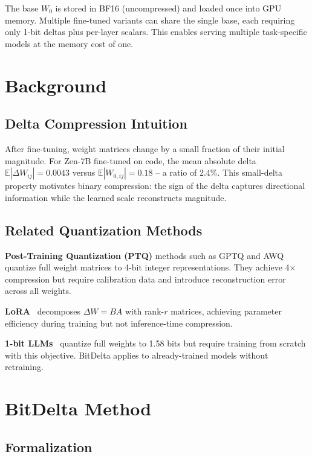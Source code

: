 \documentclass[11pt,a4paper]{article}
\begin{document}
The base $W_0$ is stored in BF16 (uncompressed) and loaded once into GPU memory.
Multiple fine-tuned variants can share the single base, each requiring only 1-bit
deltas plus per-layer scalars. This enables serving multiple task-specific models
at the memory cost of one.

\section{Background}

\subsection{Delta Compression Intuition}

After fine-tuning, weight matrices change by a small fraction of their initial magnitude.
For Zen-7B fine-tuned on code, the mean absolute delta $\mathbb{E}|\Delta W_{ij}| = 0.0043$
versus $\mathbb{E}|W_{0,ij}| = 0.18$ -- a ratio of 2.4\%. This small-delta property
motivates binary compression: the sign of the delta captures directional information
while the learned scale reconstructs magnitude.

\subsection{Related Quantization Methods}

\textbf{Post-Training Quantization (PTQ)} methods such as GPTQ and AWQ quantize full
weight matrices to 4-bit integer representations. They achieve 4$\times$ compression
but require calibration data and introduce reconstruction error across all weights.

\textbf{LoRA}~\cite{hu2021lora} decomposes $\Delta W = BA$ with rank-$r$ matrices,
achieving parameter efficiency during training but not inference-time compression.

\textbf{1-bit LLMs}~\cite{ma2024bitnet} quantize full weights to 1.58 bits but
require training from scratch with this objective. BitDelta applies to already-trained
models without retraining.

\section{BitDelta Method}

\subsection{Formalization}
\end{document}
